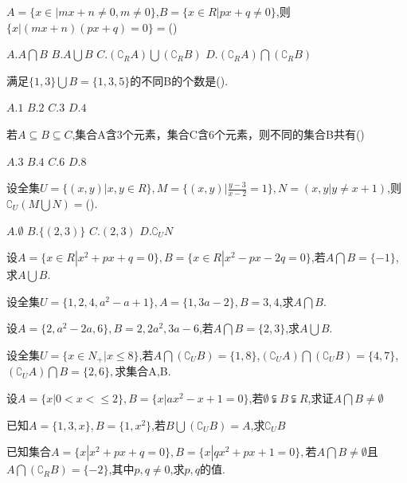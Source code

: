 \begin{example}
	$A=\{x\in |mx+n \neq 0,m\neq 0\}$,$B=\{x\in R|px+q\neq 0\}$,则$\{x|(mx+n)(px+q)=0\}=$()\par
	$A.A\bigcap B$  \hfil   $B.A\bigcup B$ \hfil   $C.(\complement _R A)\bigcup (\complement _R B)$  \hfil   $D.(\complement _R A)\bigcap (\complement _R B)$
\end{example}
\begin{example}
	满足$\{1,3\}\bigcup B =\{1,3,5\}$的不同B的个数是(\quad).\par
	$A.1$  \hfil  $B.2$ \hfil   $C.3$ \hfil     $D.4$
\end{example}
\begin{example}	
	若$A\subseteq B \subseteq C$,集合A含3个元素，集合C含6个元素，则不同的集合B共有(\quad)\par
	$A.3$  \hfil  $B.4$ \hfil   $C.6$ \hfil     $D.8$
\end{example}
\begin{example}
	设全集$U=\{(x,y)|x,y\in R\},M=\{(x,y)|\frac{y-3}{x-2}=1\},N={(x,y|y\neq x+1)}$,则$\complement _U (M\bigcup N)=$(\quad).\par
	$A.\emptyset$  \hfil  $B.\{(2,3)\}$ \hfil   $C.(2,3)$ \hfil     $D.\complement _U N$
\end{example}
\begin{example}
	设$A=\{x\in R| x^2+px +q=0\},B=\{x\in R |x^2-px-2q=0\}$,若$A\bigcap B=\{-1\}$,求$A\bigcup B$.
\vspace{3cm}
\end{example}
\begin{example}
	设全集$U=\{1,2,4,a^2-a+1\},A=\{1,3a-2\},B={3,4}$,求$A\bigcap B$.
\vspace{3cm}
\end{example}
\begin{example}
	设$A=\{2,a^2-2a,6\},B={2,2a^2,3a-6}$,若$A\bigcap B=\{2,3\}$,求$A\bigcup B$.
\vspace{3cm}
\end{example}
\begin{example}
	设全集$U=\{x\in N_+ | x \leq 8 \}$,若$A\bigcap (\complement _U B)=\{1,8\}$,$(\complement _U A)\bigcap (\complement _U B)=\{4,7\}$,$(\complement _U A)\bigcap B=\{2,6\},$求集合A,B.
\vspace{3cm}
\end{example}
\begin{example}
	设$A=\{x|0<x<\leq 2\},B=\{x|ax^2-x+1=0\}$,若$\emptyset\subsetneqq B\subsetneqq R$,求证$A\bigcap B\neq \emptyset $
\vspace{3cm}
\end{example}
\begin{example}
	已知$A=\{1,3,x\},B=\{1,x^2\}$,若$B\bigcup (\complement _U B)=A$,求$\complement _U B$
	\vspace{3cm}
\end{example}
\begin{example}
	已知集合$A=\{x|x^2+px+q=0\},B=\{x|qx^2+px+1=0\},$若$A\bigcap B\neq \emptyset$且$A\bigcap (\complement _R B)=\{-2\}$,其中$p,q\neq 0$,求$p,q$的值.
\end{example}